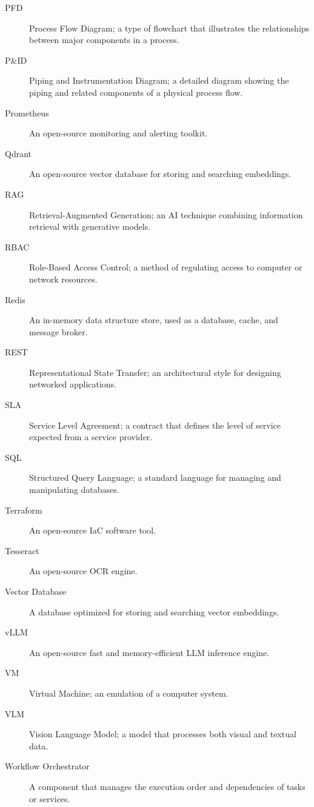 \documentclass[12pt]{report}
\begin{document}
\begin{description}
  \item[PFD] Process Flow Diagram; a type of flowchart that illustrates the relationships between major components in a process.
  \item[P\&ID] Piping and Instrumentation Diagram; a detailed diagram showing the piping and related components of a physical process flow.
  \item[Prometheus] An open-source monitoring and alerting toolkit.
  \item[Qdrant] An open-source vector database for storing and searching embeddings.
  \item[RAG] Retrieval-Augmented Generation; an AI technique combining information retrieval with generative models.
  \item[RBAC] Role-Based Access Control; a method of regulating access to computer or network resources.
  \item[Redis] An in-memory data structure store, used as a database, cache, and message broker.
  \item[REST] Representational State Transfer; an architectural style for designing networked applications.
  \item[SLA] Service Level Agreement; a contract that defines the level of service expected from a service provider.
  \item[SQL] Structured Query Language; a standard language for managing and manipulating databases.
  \item[Terraform] An open-source IaC software tool.
  \item[Tesseract] An open-source OCR engine.
  \item[Vector Database] A database optimized for storing and searching vector embeddings.
  \item[vLLM] An open-source fast and memory-efficient LLM inference engine.
  \item[VM] Virtual Machine; an emulation of a computer system.
  \item[VLM] Vision Language Model; a model that processes both visual and textual data.
  \item[Workflow Orchestrator] A component that manages the execution order and dependencies of tasks or services.
\end{description}
\end{document}
